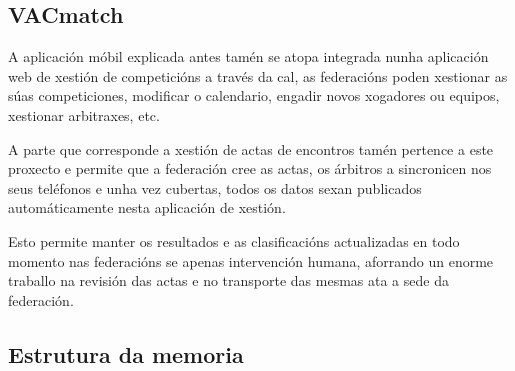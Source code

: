     \subsection{VACmatch}
    A aplicación móbil explicada antes tamén se atopa integrada nunha 
aplicación web de xestión de competicións a través da cal, as federacións poden 
xestionar as súas competiciones, modificar o calendario, engadir novos 
xogadores ou equipos, xestionar arbitraxes, etc.

    A parte que corresponde a xestión de actas de encontros tamén pertence a 
este proxecto e permite que a federación cree as actas, os árbitros a 
sincronicen nos seus teléfonos e unha vez cubertas, todos os datos sexan 
publicados automáticamente nesta aplicación de xestión.

    Esto permite manter os resultados e as clasificacións actualizadas en todo 
momento nas federacións se apenas intervención humana, aforrando un enorme 
traballo na revisión das actas e no transporte das mesmas ata a sede da 
federación.


  \subsection{Estrutura da memoria}
  
  
  